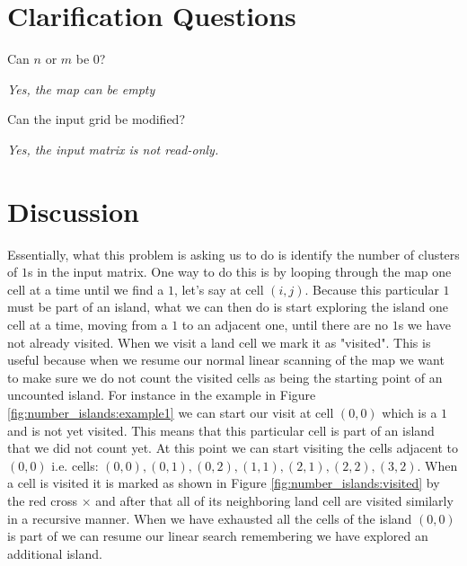 \section{Clarification Questions}

\begin{QandA}
	\item \begin{questionitem} \begin{question} Can $n$ or $m$ be $0$?  \end{question} 	 
    \begin{answered}
		\textit{Yes, the map can be empty}
	\end{answered} \end{questionitem}
	\item \begin{questionitem} \begin{question} Can the input grid be modified?  \end{question} 	 
    \begin{answered}
		\textit{Yes, the input matrix is not read-only.}
	\end{answered} \end{questionitem}
\end{QandA}

\section{Discussion}
\label{number_islands:sec:discussion}
Essentially, what  this problem is asking us to do is identify the number of clusters of $1$s in the input matrix.
One way to do this is by looping through the map one cell at a time until we find a $1$, let's say at cell $(i,j)$.
Because this particular $1$ must be part of an island, what we can then do is start exploring the island
one cell at a time, moving from a $1$ to an adjacent one, until there are no $1$s we have not already visited.
When we visit a land cell we mark it as "visited".
This is useful because when we resume our normal linear scanning of the map we want to make
sure we do not count the visited cells as being the starting point of an uncounted island.
For instance in the example in Figure \ref{fig:number_islands:example1} we can start our visit
at cell $(0,0)$ which is a $1$ and is not yet visited. This means that this particular cell is
part of an island that we did not count yet. At this point we can start visiting the cells adjacent
to $(0,0)$ i.e. cells: $(0,0), (0,1), (0,2), (1,1), (2,1), (2,2), (3,2)$. When a cell is visited it is
marked as shown in Figure  \ref{fig:number_islands:visited} by the red cross
\textcolor[HTML]{860000}{$\times$} and after that all of its neighboring land cell are visited similarly in a recursive manner.
When we have exhausted all the cells of the island $(0,0)$ is part of we can resume our linear search remembering we have explored an additional island.

